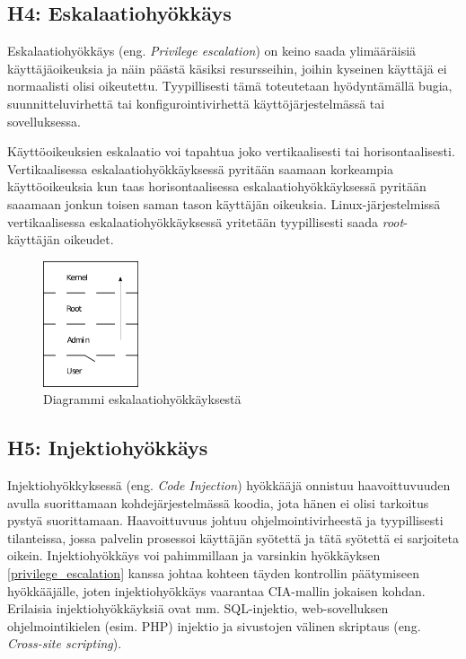 \subsection{H4: Eskalaatiohyökkäys}
Eskalaatiohyökkäys (eng. \textit{Privilege escalation}) on keino saada ylimääräisiä käyttäjäoikeuksia ja näin päästä käsiksi resursseihin, joihin kyseinen käyttäjä ei normaalisti olisi oikeutettu. Tyypillisesti tämä toteutetaan hyödyntämällä bugia, suunnitteluvirhettä tai konfigurointivirhettä käyttöjärjestelmässä tai sovelluksessa.

Käyttöoikeuksien eskalaatio voi tapahtua joko vertikaalisesti tai horisontaalisesti. Vertikaalisessa eskalaatiohyökkäyksessä pyritään saamaan korkeampia käyttöoikeuksia kun taas horisontaalisessa eskalaatiohyökkäyksessä pyritään saaamaan jonkun toisen saman tason käyttäjän oikeuksia. Linux-järjestelmissä vertikaalisessa eskalaatiohyökkäyksessä yritetään tyypillisesti saada \textit{root}-käyttäjän oikeudet.~\cite{ciampa2012security+}

\begin{figure}
\centering \includegraphics[width=0.25\textwidth]{kuvat/privilege_escalation.png}
\caption{Diagrammi eskalaatiohyökkäyksestä~\cite{wikipedia:privilege_escalation}}
\label{privilege_escalation_diagram} 
\end{figure}

\subsection{H5: Injektiohyökkäys}
Injektiohyökkyksessä (eng. \textit{Code Injection}) hyökkääjä onnistuu haavoittuvuuden avulla suorittamaan kohdejärjestelmässä koodia, jota hänen ei olisi tarkoitus pystyä suorittamaan. Haavoittuvuus johtuu ohjelmointivirheestä ja tyypillisesti tilanteissa, jossa palvelin prosessoi käyttäjän syötettä ja tätä syötettä ei sarjoiteta oikein. Injektiohyökkäys voi pahimmillaan ja varsinkin hyökkäyksen \ref{privilege_escalation} kanssa johtaa kohteen täyden kontrollin päätymiseen hyökkääjälle, joten injektiohyökkäys vaarantaa CIA-mallin jokaisen kohdan. Erilaisia injektiohyökkäyksiä ovat mm. SQL-injektio, web-sovelluksen ohjelmointikielen (esim. PHP) injektio ja sivustojen välinen skriptaus (eng. \textit{Cross-site scripting}).

